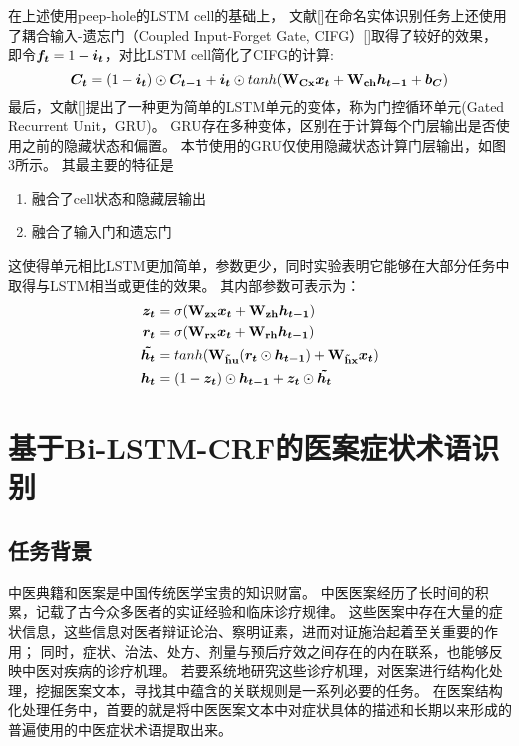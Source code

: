 在上述使用peep-hole的LSTM cell的基础上，
文献[]在命名实体识别任务上还使用了耦合输入-遗忘门（Coupled Input-Forget Gate, CIFG）[]取得了较好的效果，
即令$\boldsymbol{f_t} = 1 - \boldsymbol{i_t}$，对比LSTM cell简化了CIFG的计算:
\begin{equation*}
    \boldsymbol{C_t} = (1 - \boldsymbol{i_t})\odot \boldsymbol{C_{t-1}} + \boldsymbol{i_t}\odot tanh(\boldsymbol{\mathbf{W_{Cx}}}\boldsymbol{x_t} + \boldsymbol{\mathbf{W_{ch}}}\boldsymbol{h_{t-1}} + \boldsymbol{b_C})
\end{equation*}
最后，文献[]提出了一种更为简单的LSTM单元的变体，称为门控循环单元(Gated Recurrent Unit，GRU)。
GRU存在多种变体，区别在于计算每个门层输出是否使用之前的隐藏状态和偏置。
本节使用的GRU仅使用隐藏状态计算门层输出，如图3所示。
其最主要的特征是
\begin{enumerate}
    \item 融合了cell状态和隐藏层输出
    \item 融合了输入门和遗忘门
\end{enumerate}
这使得单元相比LSTM更加简单，参数更少，同时实验表明它能够在大部分任务中取得与LSTM相当或更佳的效果。
其内部参数可表示为：
\begin{align*}
    \boldsymbol{z_t} &= \sigma(\boldsymbol{\mathbf{W_{zx}}}\boldsymbol{x_t} + \boldsymbol{\mathbf{W_{zh}}}\boldsymbol{h_{t-1}})\\
    \boldsymbol{r_t} &= \sigma(\boldsymbol{\mathbf{W_{rx}}}\boldsymbol{x_t} + \boldsymbol{\mathbf{W_{rh}}}\boldsymbol{h_{t-1}})\\
    \boldsymbol{\tilde{h_t}} &= tanh(\boldsymbol{\mathbf{W_{\tilde{h}u}}}(\boldsymbol{r_t} \odot \boldsymbol{h_{t-1}}) + \boldsymbol{\mathbf{W_{\tilde{h}x}}}\boldsymbol{x_t})\\
    \boldsymbol{h_t} &= (1 - \boldsymbol{z_t}) \odot \boldsymbol{h_{t-1}} + \boldsymbol{z_t} \odot \boldsymbol{\tilde{h_t}}
\end{align*}

\section{基于Bi-LSTM-CRF的医案症状术语识别}
\subsection{任务背景}
中医典籍和医案是中国传统医学宝贵的知识财富。
中医医案经历了长时间的积累，记载了古今众多医者的实证经验和临床诊疗规律。
这些医案中存在大量的症状信息，这些信息对医者辩证论治、察明证素，进而对证施治起着至关重要的作用；
同时，症状、治法、处方、剂量与预后疗效之间存在的内在联系，也能够反映中医对疾病的诊疗机理。
若要系统地研究这些诊疗机理，对医案进行结构化处理，挖掘医案文本，寻找其中蕴含的关联规则是一系列必要的任务。
在医案结构化处理任务中，首要的就是将中医医案文本中对症状具体的描述和长期以来形成的普遍使用的中医症状术语提取出来。


